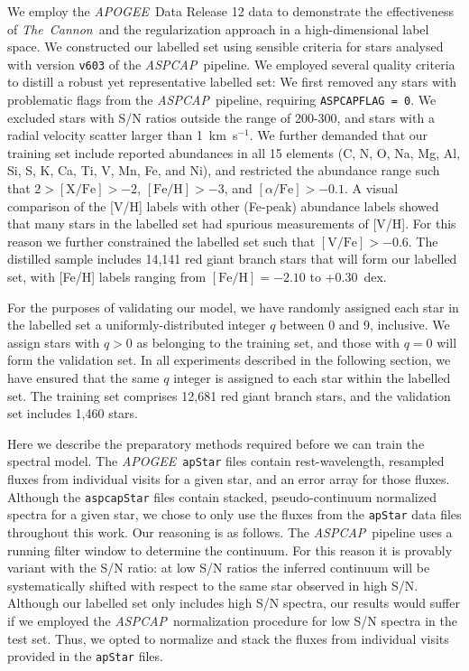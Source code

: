 \documentclass[12pt,preprint]{aastex}
\newcommand{\project}[1]{\textsl{#1}}
\newcommand{\TheCannon}{\project{The~Cannon}}
\newcommand{\acronym}[1]{{\small{#1}}}
\newcommand{\apogee}{\project{\acronym{APOGEE}}}
\newcommand{\aspcap}{\project{\acronym{ASPCAP}}}
\begin{document}
We employ the \apogee\ Data Release 12 data to demonstrate the effectiveness of
\TheCannon\ and the regularization approach in a high-dimensional label space.
We constructed our labelled set using sensible criteria for stars analysed with 
version \texttt{v603} of the \aspcap\ pipeline.  We employed several quality criteria 
to distill a robust yet representative labelled set: We first removed any stars
with problematic flags from the \aspcap\ pipeline, requiring 
\texttt{ASPCAPFLAG = 0}.  We excluded stars with S/N ratios outside the range of
200-300, and stars with a radial velocity scatter larger than 1~km~s$^{-1}$.  We
further demanded that our training set include reported abundances in all 15 
elements (C, N, O, Na, Mg, Al, Si, S, K, Ca, Ti, V, Mn, Fe, and Ni), and 
restricted the abundance range such that $2 > \mathrm{[X/Fe]} > -2$, 
$\mathrm{[Fe/H]} > -3$, and $[\alpha/\mathrm{Fe}] > -0.1$.  A visual comparison 
of the [V/H] labels with other (Fe-peak) abundance labels showed that many stars
in the labelled set had spurious measurements of [V/H].  For this reason we 
further constrained the labelled set such that $\mathrm{[V/Fe]} > -0.6$.  The 
distilled sample includes 14,141 red giant branch stars that will form our 
labelled set, with [Fe/H] labels ranging from $\mathrm{[Fe/H]} = -2.10$ to +0.30~dex. 


For the purposes of validating our model, we have randomly
assigned each star in the labelled set a uniformly-distributed integer $q$ between 0
and 9, inclusive.  We assign stars with $q > 0$ as belonging to the
training set, and those with $q = 0$ will form the validation set.  In all
experiments described in the following section, we have ensured that the same $q$ integer is assigned to each
star within the labelled set.  The training set comprises 12,681 red giant
branch stars, and the validation set includes 1,460 stars.


Here we describe the preparatory methods required before we can train the spectral model.
The \apogee\ \texttt{apStar} files contain rest-wavelength, resampled fluxes 
from individual visits for a given star, and an error array for those fluxes.
Although the \texttt{aspcapStar} files contain stacked, pseudo-continuum 
normalized spectra for a given star, we chose to only use the fluxes from the 
\texttt{apStar} data files throughout this work.  Our reasoning is as follows. 
The \aspcap\ pipeline uses a running filter window to determine the continuum.  
For this reason it is provably variant with the S/N ratio: at low S/N ratios the 
inferred continuum will be systematically shifted with respect to the same star 
observed in high S/N.  Although our labelled set only includes high S/N spectra,
our results would suffer if we employed the \aspcap\ normalization procedure for
low S/N spectra in the test set.  Thus, we opted to normalize and stack the
fluxes from individual visits provided in the \texttt{apStar} files.
\end{document}
